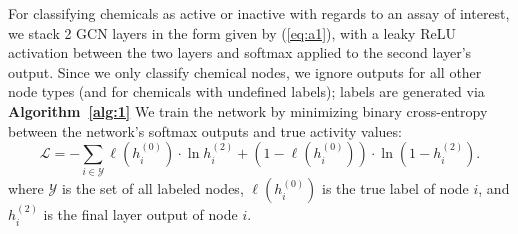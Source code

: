 \documentclass{ws-procs11x85}
\begin{document}
\label{NC}
For classifying chemicals as active or inactive with regards to an assay of interest, we stack 2 GCN layers in the form given by (\ref{eq:a1}), with a leaky ReLU activation between the two layers and softmax applied to the second layer's output.
Since we only classify chemical nodes, we ignore outputs for all other node types (and for chemicals with undefined labels); labels are generated via \textbf{Algorithm~\ref{alg:1}}
We train the network by minimizing binary cross-entropy between the network's softmax outputs and true activity values:
\begin{equation}
   \mathcal{L} = -\sum_{i\in\mathcal{Y}}
   \ell(h_i^{(0)}) \cdot\ln h_{i}^{(2)} +
   (1 - \ell(h_i^{(0)})) \cdot\ln (1 - h_{i}^{(2)}).\label{eq:b1}
\end{equation}
where $\mathcal{Y}$ is the set of all labeled nodes, $\ell(h_i^{(0)})$ is the true label of node $i$, and $h_i^{(2)}$ is the final layer output of node $i$.



\end{document}
